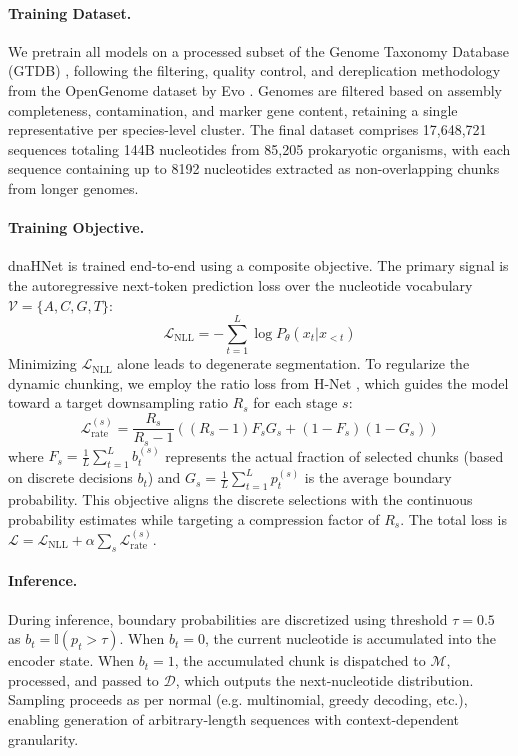 \documentclass{article}
\theoremstyle{plain}
\theoremstyle{definition}
\theoremstyle{remark}
\begin{document}
\paragraph{Training Dataset.}
We pretrain all models on a processed subset of the Genome Taxonomy Database (GTDB) \citep{Parks2025}, following the filtering, quality control, and dereplication methodology from the OpenGenome dataset by Evo \citep{Nguyen2024}. Genomes are filtered based on assembly completeness, contamination, and marker gene content, retaining a single representative per species-level cluster. The final dataset comprises 17,648,721 sequences totaling 144B nucleotides from 85,205 prokaryotic organisms, with each sequence containing up to 8192 nucleotides extracted as non-overlapping chunks from longer genomes.

\paragraph{Training Objective.}
dnaHNet is trained end-to-end using a composite objective. The primary signal is the autoregressive next-token prediction loss over the nucleotide vocabulary $\mathcal{V} = \{A, C, G, T\}$:
\begin{equation}
    \mathcal{L}_{\text{NLL}} = - \sum_{t=1}^{L} \log P_\theta(x_t | x_{<t})
\end{equation}
Minimizing $\mathcal{L}_{\text{NLL}}$ alone leads to degenerate segmentation. To regularize the dynamic chunking, we employ the ratio loss from H-Net \citep{hwang2025dynamicchunkingendtoendhierarchical}, which guides the model toward a target downsampling ratio $R_s$ for each stage $s$:
\begin{equation}
    \mathcal{L}_{\text{rate}}^{(s)} = \frac{R_s}{R_s - 1} \left( (R_s - 1) F_s G_s + (1 - F_s)(1 - G_s) \right)
\end{equation}
where $F_s = \frac{1}{L} \sum_{t=1}^L b_t^{(s)}$ represents the actual fraction of selected chunks (based on discrete decisions $b_t$) and $G_s = \frac{1}{L} \sum_{t=1}^L p_t^{(s)}$ is the average boundary probability. This objective aligns the discrete selections with the continuous probability estimates while targeting a compression factor of $R_s$. The total loss is $\mathcal{L} = \mathcal{L}_{\text{NLL}} + \alpha \sum_{s} \mathcal{L}_{\text{rate}}^{(s)}$.

\paragraph{Inference.}
During inference, boundary probabilities are discretized using threshold $\tau = 0.5$ as $b_t = \mathbb{I}(p_t > \tau)$. When $b_t = 0$, the current nucleotide is accumulated into the encoder state. When $b_t = 1$, the accumulated chunk is dispatched to $\mathcal{M}$, processed, and passed to $\mathcal{D}$, which outputs the next-nucleotide distribution. Sampling proceeds as per normal (e.g. multinomial, greedy decoding, etc.), enabling generation of arbitrary-length sequences with context-dependent granularity.
\end{document}

